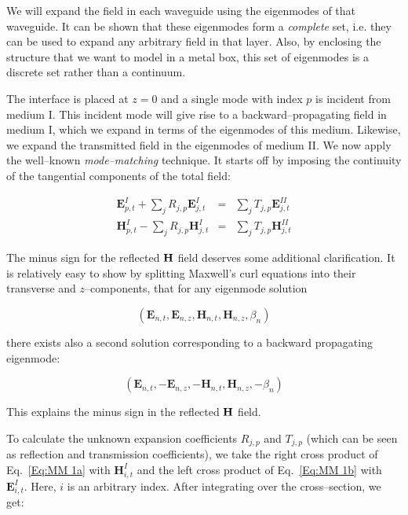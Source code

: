 We will expand the field in each waveguide using the eigenmodes of that waveguide. It can be shown that these eigenmodes form a \emph{complete} set, i.e. they can be used to expand any arbitrary field in that layer. Also, by enclosing the structure that we want to model in a metal box, this set of eigenmodes is a discrete set rather than a continuum.

The interface is placed at $z=0$ and a single mode with index $p$ is incident
from medium I. This incident mode will give rise to a backward--propagating field
in medium I, which we expand in terms of the eigenmodes of this medium. Likewise,
we expand the transmitted field in the eigenmodes of medium II. We now apply the well--known \emph{mode--matching} technique. It starts off by imposing the continuity of the tangential components of the
total field: 

\begin{eqnarray}
\mathbf{E}^{I}_{p,t}+\sum _{j}R_{j,p}\mathbf{E}^{I}_{j,t} & = & \sum _{j}T_{j,p}\mathbf{E}^{II}_{j,t}\label{Eq:MM 1a} \\
\mathbf{H}^{I}_{p,t}-\sum _{j}R_{j,p}\mathbf{H}^{I}_{j,t} & = & \sum _{j}T_{j,p}\mathbf{H}^{II}_{j,t}\label{Eq:MM 1b} 
\end{eqnarray}

The minus sign for the reflected ${\bf H}$ field deserves some additional clarification. It is relatively easy to show by splitting Maxwell's curl equations into their transverse and $z$--components, that for any eigenmode solution 

\begin{equation}
\label{Eq:eigen fw}
\left( \mathbf{E}_{n,t},\mathbf{E}_{n,z},\mathbf{H}_{n,t},\mathbf{H}_{n,z},\beta _{n}\right) 
\end{equation}

there exists also a second solution corresponding to a backward propagating eigenmode:

\begin{equation}
\label{Eq:eigen bw}
\left( \mathbf{E}_{n,t},-\mathbf{E}_{n,z},-\mathbf{H}_{n,t},\mathbf{H}_{n,z},-\beta _{n}\right) 
\end{equation}

This explains the minus sign in the reflected ${\bf H}$ field.

To calculate the unknown expansion coefficients $R_{j,p}$ and $T_{j,p}$
(which can be seen as reflection and transmission coefficients), we take the
right cross product of Eq.~\ref{Eq:MM 1a} with $\mathbf{H}^{I}_{i,t}$
and the left cross product of Eq.~\ref{Eq:MM 1b} with $\mathbf{E}^{I}_{i,t}$.
Here, $i$ is an arbitrary index. After integrating over the cross--section,
we get:

